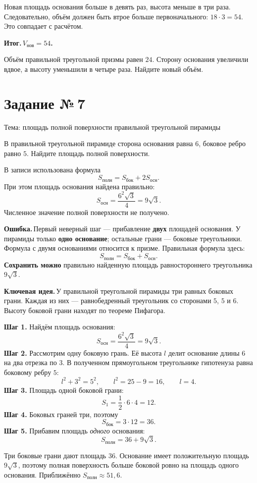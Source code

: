 \documentclass[a4paper,12pt]{article}
\newcommand{\keyidea}{\textcolor{darkaccent}{\textbf{Ключевая идея.}}\,}
\newcommand{\errorlead}{\textcolor{alert}{\textbf{Ошибка.}}\,}
\newcommand{\outcome}{\textcolor{darkaccent}{\textbf{Итог.}}\,}
\newcommand{\parthead}[1]{\par\vspace{4pt}{\bfseries\textcolor{ink}{#1}}\par\vspace{1pt}}
\newcommand{\taskhead}[2]{\phantomsection\label{task:#1}\section*{Задание №\,#1}\textcolor{muted}{#2}\par\smallskip}
\begin{document}
\parthead{Проверка}
Новая площадь основания больше в девять раз, высота меньше в три раза. Следовательно, объём должен быть втрое больше первоначального: $18\cdot3=54$. Это совпадает с расчётом.

\outcome \textbf{$V_{\text{нов}}=54$.}

\parthead{Задача на закрепление}
Объём правильной треугольной призмы равен $24$. Сторону основания увеличили вдвое, а высоту уменьшили в четыре раза. Найдите новый объём.

\newpage
\taskhead{7}{Тема: площадь полной поверхности правильной треугольной пирамиды}
\parthead{Условие}
В правильной треугольной пирамиде сторона основания равна $6$, боковое ребро равно $5$. Найдите площадь полной поверхности.

\parthead{Ваше решение и ответ}
В записи использована формула
\[
S_{\text{полн}}=S_{\text{бок}}+2S_{\text{осн}}.
\]
При этом площадь основания найдена правильно:
\[
S_{\text{осн}}=\frac{6^2\sqrt3}{4}=9\sqrt3.
\]
Численное значение полной поверхности не получено.

\parthead{Где возникает ошибка}
\errorlead Первый неверный шаг --- прибавление \textbf{двух} площадей основания. У пирамиды только \textbf{одно основание}; остальные грани --- боковые треугольники. Формула с двумя основаниями относится к призме. Правильная формула здесь:
\[
S_{\text{полн}}=S_{\text{бок}}+S_{\text{осн}}.
\]
\textbf{Сохранить можно} правильно найденную площадь равностороннего треугольника $9\sqrt3$.

\parthead{Ключевая идея}
\keyidea У правильной треугольной пирамиды три равных боковых грани. Каждая из них --- равнобедренный треугольник со сторонами $5$, $5$ и $6$. Высоту боковой грани находят по теореме Пифагора.

\parthead{Исправление и полное правильное решение}
\textbf{Шаг 1.} Найдём площадь основания:
\[
S_{\text{осн}}=\frac{6^2\sqrt3}{4}=9\sqrt3.
\]
\textbf{Шаг 2.} Рассмотрим одну боковую грань. Её высота $l$ делит основание длины $6$ на два отрезка по $3$. В полученном прямоугольном треугольнике гипотенуза равна боковому ребру $5$:
\[
l^2+3^2=5^2,\qquad l^2=25-9=16,
\qquad l=4.
\]
\textbf{Шаг 3.} Площадь одной боковой грани:
\[
S_1=\frac12\cdot6\cdot4=12.
\]
\textbf{Шаг 4.} Боковых граней три, поэтому
\[
S_{\text{бок}}=3\cdot12=36.
\]
\textbf{Шаг 5.} Прибавим площадь \emph{одного} основания:
\[
S_{\text{полн}}=36+9\sqrt3.
\]

\parthead{Проверка}
Три боковые грани дают площадь $36$. Основание имеет положительную площадь $9\sqrt3$, поэтому полная поверхность больше боковой ровно на площадь одного основания. Приближённо $S_{\text{полн}}\approx51{,}6$.
\end{document}
